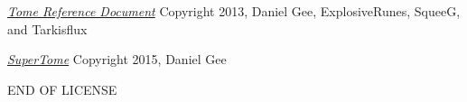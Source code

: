 \begin{small}
\begin{enumerate}
%
%
%
%
%
%
%
%
%
%
%
%
%
%
%
%
%
%
%
%
%

\href{https://github.com/SqueeG/awesomeTome}{\textit{Tome Reference Document}} Copyright 2013, Daniel Gee, ExplosiveRunes, SqueeG, and Tarkisflux

\href{https://github.com/Lokathor/SuperTome}{\textit{SuperTome}} Copyright 2015, Daniel Gee
\end{enumerate}

END OF LICENSE

\end{small}
